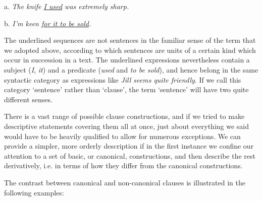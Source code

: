 \begin{examples}\item
\noindent\begin{minipage}[t]{0.6\linewidth}
    a. \itshape The knife \uline{I used} was extremely sharp.
\end{minipage}\vspace{-\medskipamount}
\begin{minipage}[t]{0.4\linewidth}
    b. \itshape I'm keen \uline{for it to be sold}.
\end{minipage}\vspace{-\medskipamount}
\end{examples}
The underlined sequences are not sentences in the familiar sense of the term that we adopted above, according to which sentences are units of a certain kind which occur in succession in a text. The underlined expressions nevertheless contain a subject (\textit{I}, \textit{it}) and a predicate (\textit{used} and \textit{to be sold}), and hence belong in the same syntactic category as expressions like \textit{Jill seems quite friendly}. If we call this category `sentence' rather than `clause', the term `sentence' will have two quite different senses.



There is a vast range of possible clause constructions, and if we tried to make descriptive statements covering them all at once, just about everything we said would have to be heavily qualified to allow for numerous exceptions. We can provide a simpler, more orderly description if in the first instance we confine our attention to a set of basic, or canonical, constructions, and then describe the rest derivatively, i.e. in terms of how they differ from the canonical constructions. 

The contrast between canonical and non-canonical clauses is illustrated in the following examples:


